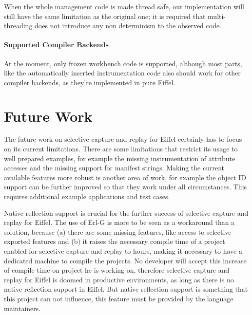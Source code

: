 When the whole management code is made thread safe, our implementation will still have the same limitation as the original one; it is required that multi-threading does not introduce any non determinism to the observed code.

\paragraph{Supported Compiler Backends}
At the moment, only frozen workbench code is supported, although most parts, like the automatically inserted instrumentation code also should work for other compiler backends, as they're implemented in pure Eiffel.


\section{Future Work}
The future work on selective capture and replay for Eiffel certainly has to focus on its current limitations. There are some limitations that restrict its usage to well prepared examples, for example the missing instrumentation of attribute accesses and the missing support for manifest strings. Making the current available features more robust is another area of work, for example the object ID support can be further improved so that they work under all circumstances. This requires additional example applications and test cases.

Native reflection support is crucial for the further success of selective capture and replay for Eiffel. The use of Erl-G is more to be seen as a workaround than a solution, because (a) there are some missing features, like access to selective exported features and (b) it raises the necessary compile time of a project enabled for selective capture and replay to hours, making it necessary to have a dedicated machine to compile the projects. No developer will accept this increase of compile time on project he is working on, therefore selective capture and replay for Eiffel is doomed in productive environments, as long as there is no native reflection support in Eiffel. But native reflection support is something that this project can not influence, this feature must be provided by the language maintainers.
